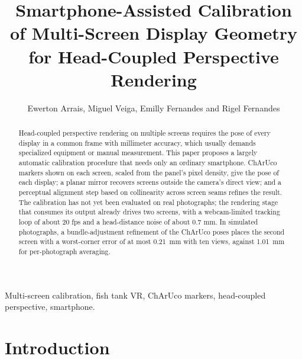 \documentclass[english,hidelinks]{sbrt}
\begin{document}
\title{Smartphone-Assisted Calibration of Multi-Screen Display Geometry for Head-Coupled Perspective Rendering}

\author{Ewerton Arrais, Miguel Veiga, Emilly Fernandes and Rigel Fernandes}

\maketitle


\begin{abstract}
Head-coupled perspective rendering on multiple screens requires the pose of every display in a common frame with millimeter accuracy, which usually demands specialized equipment or manual measurement. This paper proposes a largely automatic calibration procedure that needs only an ordinary smartphone. ChArUco markers shown on each screen, scaled from the panel's pixel density, give the pose of each display; a planar mirror recovers screens outside the camera's direct view; and a perceptual alignment step based on collinearity across screen seams refines the result. The calibration has not yet been evaluated on real photographs; the rendering stage that consumes its output already drives two screens, with a webcam-limited tracking loop of about 20 fps and a head-distance noise of about 0.7 mm.
In simulated photographs, a bundle-adjustment refinement of the ChArUco poses places the second screen with a worst-corner error of at most 0.21~mm with ten views, against 1.01~mm for per-photograph averaging.
\end{abstract}
\begin{keywords}
Multi-screen calibration, fish tank VR, ChArUco markers, head-coupled perspective, smartphone.
\end{keywords}

\section{Introduction}
\end{document}
